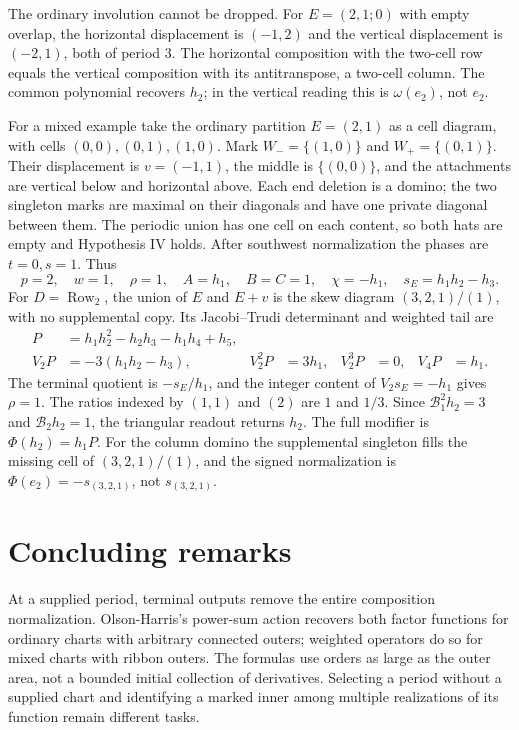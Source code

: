 \documentclass[11pt,a4paper]{amsart}
\numberwithin{equation}{section}
\theoremstyle{plain}
\theoremstyle{definition}
\begin{document}
The ordinary involution cannot be dropped.  For \(E=(2,1;0)\) with empty overlap, the horizontal displacement is \((-1,2)\) and the vertical displacement is \((-2,1)\), both of period \(3\).  The horizontal composition with the two-cell row equals the vertical composition with its antitranspose, a two-cell column.  The common polynomial recovers \(h_2\); in the vertical reading this is \(\omega(e_2)\), not \(e_2\).

For a mixed example take the ordinary partition \(E=(2,1)\) as a cell diagram, with cells \((0,0),(0,1),(1,0)\).  Mark \(W_-=\{(1,0)\}\) and \(W_+=\{(0,1)\}\).  Their displacement is \(v=(-1,1)\), the middle is \(\{(0,0)\}\), and the attachments are vertical below and horizontal above.  Each end deletion is a domino; the two singleton marks are maximal on their diagonals and have one private diagonal between them.  The periodic union has one cell on each content, so both hats are empty and Hypothesis IV holds.  After southwest normalization the phases are \(t=0,s=1\).  Thus
\[
 p=2,\quad w=1,\quad \rho=1,\quad A=h_1,\quad B=C=1,\quad
 \chi=-h_1,\quad s_E=h_1h_2-h_3.
\]
For \(D=\operatorname{Row}_2\), the union of \(E\) and \(E+v\) is the skew diagram \((3,2,1)/(1)\), with no supplemental copy.  Its Jacobi--Trudi determinant and weighted tail are
\begin{equation}\label{eq:mixed-example}
 \begin{aligned}
 P&=h_1h_2^2-h_2h_3-h_1h_4+h_5,\\
 V_2P&=-3(h_1h_2-h_3),&
 V_2^2P&=3h_1,& V_2^3P&=0,& V_4P&=h_1.
 \end{aligned}
\end{equation}
The terminal quotient is \(-s_E/h_1\), and the integer content of \(V_2s_E=-h_1\) gives \(\rho=1\).  The ratios indexed by \((1,1)\) and \((2)\) are \(1\) and \(1/3\).  Since \(\mathcal B_1^2h_2=3\) and \(\mathcal B_2h_2=1\), the triangular readout returns \(h_2\).  The full modifier is \(\Phi(h_2)=h_1P\).  For the column domino the supplemental singleton fills the missing cell of \((3,2,1)/(1)\), and the signed normalization is
\(\Phi(e_2)=-s_{(3,2,1)}\), not \(s_{(3,2,1)}\).

\section{Concluding remarks}\label{sec:conclusion}

At a supplied period, terminal outputs remove the entire composition normalization.  Olson-Harris's power-sum action recovers both factor functions for ordinary charts with arbitrary connected outers; weighted operators do so for mixed charts with ribbon outers.  The formulas use orders as large as the outer area, not a bounded initial collection of derivatives.  Selecting a period without a supplied chart and identifying a marked inner among multiple realizations of its function remain different tasks.
\end{document}
